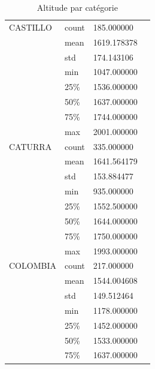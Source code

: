 \begin{table}[H]
	\centering
	\caption{Altitude par catégorie}
	\label{VariedadASNM}
	\begin{tabular}{llll}
		CASTILLO & count                                & 185.000000 &  \\
		&mean     & 1619.178378                                      &  \\
		&std      & 174.143106                                       &  \\
		&min      & 1047.000000                                      &  \\
		&25\%     & 1536.000000                                      &  \\
		&50\%     & 1637.000000                                      &  \\
		&75\%     & 1744.000000                                      &  \\
		&max      & 2001.000000                                      &  \\
		CATURRA  & count                                & 335.000000 &  \\
		&mean     & 1641.564179                                      &  \\
		&std      & 153.884477                                       &  \\
		&min      & 935.000000                                       &  \\
		&25\%     & 1552.500000                                      &  \\
		&50\%     & 1644.000000                                      &  \\
		&75\%     & 1750.000000                                      &  \\
		&max      & 1993.000000                                      &  \\
		COLOMBIA & count                                & 217.000000 &  \\
		&mean     & 1544.004608                                      &  \\
		&std      & 149.512464                                       &  \\
		&min      & 1178.000000                                      &  \\
		&25\%     & 1452.000000                                      &  \\
		&50\%     & 1533.000000                                      &  \\
		&75\%     & 1637.000000                                      &  \\

\end{tabular}
\end{table}
